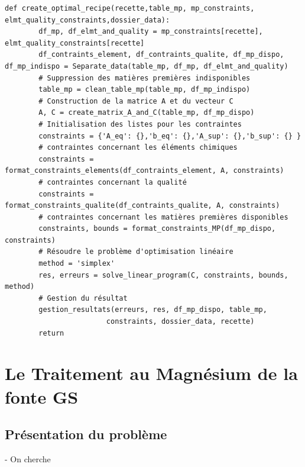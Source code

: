 \documentclass[12pt]{article}
\begin{document}


\begin{lstlisting}[style=python]
    def create_optimal_recipe(recette,table_mp, mp_constraints, elmt_quality_constraints,dossier_data):
        df_mp, df_elmt_and_quality = mp_constraints[recette], elmt_quality_constraints[recette]
        df_contraints_element, df_contraints_qualite, df_mp_dispo, df_mp_indispo = Separate_data(table_mp, df_mp, df_elmt_and_quality)
        # Suppression des matières premières indisponibles
        table_mp = clean_table_mp(table_mp, df_mp_indispo)
        # Construction de la matrice A et du vecteur C
        A, C = create_matrix_A_and_C(table_mp, df_mp_dispo)
        # Initialisation des listes pour les contraintes
        constraints = {'A_eq': {},'b_eq': {},'A_sup': {},'b_sup': {} }
        # contraintes concernant les éléments chimiques
        constraints = format_constraints_elements(df_contraints_element, A, constraints)
        # contraintes concernant la qualité
        constraints = format_constraints_qualite(df_contraints_qualite, A, constraints)
        # contraintes concernant les matières premières disponibles
        constraints, bounds = format_constraints_MP(df_mp_dispo, constraints)
        # Résoudre le problème d'optimisation linéaire
        method = 'simplex' 
        res, erreurs = solve_linear_program(C, constraints, bounds, method)
        # Gestion du résultat
        gestion_resultats(erreurs, res, df_mp_dispo, table_mp, 
                        constraints, dossier_data, recette)
        return
\end{lstlisting}
    








\section{Le Traitement au Magnésium de la fonte GS}

\subsection{Présentation du problème }



-  On cherche
\end{document}
